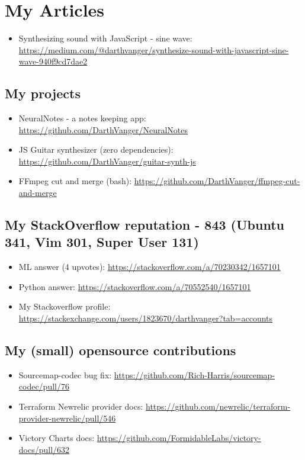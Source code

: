 \documentclass[a4paper, 14pt]{article}
\begin{document}
\section{My Articles}
  \begin{itemize}
    \item Synthesizing sound with JavaScript - sine wave: \url{https://medium.com/@darthvanger/synthesize-sound-with-javascript-sine-wave-940f9cd7dae2}
  \end{itemize}

  \subsection{My projects}
    \begin{itemize}
      \item NeuralNotes - a notes keeping app: \url{https://github.com/DarthVanger/NeuralNotes} \\
      \item JS Guitar synthesizer (zero dependencies): \url{https://github.com/DarthVanger/guitar-synth-js} \\
      \item FFmpeg cut and merge (bash): \url{https://github.com/DarthVanger/ffmpeg-cut-and-merge}
    \end{itemize}

  \subsection{My StackOverflow reputation - 843 (Ubuntu 341, Vim 301, Super User 131)}
    \begin{itemize}
      \item ML answer (4 upvotes): \url{https://stackoverflow.com/a/70230342/1657101} \\
      \item Python answer: \url{https://stackoverflow.com/a/70552540/1657101}
      \item My Stackoverflow profile: \url{https://stackexchange.com/users/1823670/darthvanger?tab=accounts} \\
    \end{itemize}

  \subsection{My (small) opensource contributions}
    \begin{itemize}
      \item Sourcemap-codec bug fix: \url{https://github.com/Rich-Harris/sourcemap-codec/pull/76} \\
      \item Terraform Newrelic provider docs: \url{https://github.com/newrelic/terraform-provider-newrelic/pull/546} \\
      \item Victory Charts docs: \url{https://github.com/FormidableLabs/victory-docs/pull/632}
    \end{itemize}
\end{document}
